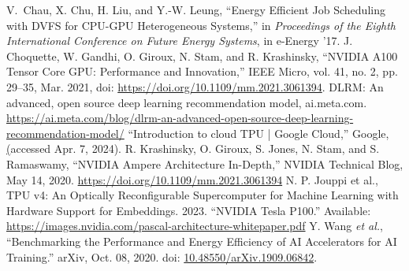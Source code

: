 \begin{thebibliography}{00}
     V. Chau, X. Chu, H. Liu, and Y.-W. Leung,
    ``Energy Efficient Job Scheduling with DVFS for CPU-GPU Heterogeneous Systems,'' in \textit{Proceedings of the Eighth International Conference on Future Energy Systems},
    in e-Energy ’17.
     J. Choquette, W. Gandhi, O. Giroux, N. Stam, and R. Krashinsky, ``NVIDIA A100 Tensor Core GPU: Performance and Innovation,'' IEEE Micro, vol. 41, no. 2, pp. 29–35, Mar. 2021, doi: \href{https://doi.org/10.1109/mm.2021.3061394}{https://doi.org/10.1109/mm.2021.3061394}.
     DLRM: An advanced, open source deep learning recommendation model, ai.meta.com. \href{https://ai.meta.com/blog/dlrm-an-advanced-open-source-deep-learning-recommendation-model/}{https://ai.meta.com/blog/dlrm-an-advanced-open-source-deep-learning-recommendation-model/}
 ``Introduction to cloud TPU  |  Google Cloud,'' Google, \href{https://cloud.google.com/tpu/docs/intro-to-tpu} (accessed Apr. 7, 2024).
 R. Krashinsky, O. Giroux, S. Jones, N. Stam, and S. Ramaswamy, ``NVIDIA Ampere Architecture In-Depth,'' NVIDIA Technical Blog, May 14, 2020. \href{https://developer.nvidia.com/blog/nvidia-ampere-architecture-in-depth/}{https://doi.org/10.1109/mm.2021.3061394}
     N. P. Jouppi et al., TPU v4: An Optically Reconfigurable Supercomputer for Machine Learning with Hardware Support for Embeddings. 2023.
 ``NVIDIA Tesla P100.'' Available: \href{https://images.nvidia.com/content/pdf/tesla/whitepaper/pascal-architecture-whitepaper.pdf}{https://images.nvidia.com/pascal-architecture-whitepaper.pdf}
 Y. Wang \textit{et al.}, “Benchmarking the Performance and Energy Efficiency of AI Accelerators for AI Training.” arXiv, Oct. 08, 2020. doi: \href{https://doi.org/10.48550/arXiv.1909.06842}{10.48550/arXiv.1909.06842}.
\end{thebibliography}